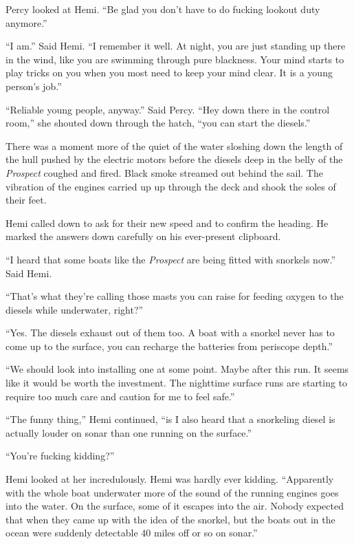 \documentclass[
]{scrbook}
\begin{document}
Percy looked at Hemi. ``Be glad you don't have to do fucking lookout
duty anymore.''

``I am.'' Said Hemi. ``I remember it well. At night, you are just
standing up there in the wind, like you are swimming through pure
blackness. Your mind starts to play tricks on you when you most need to
keep your mind clear. It is a young person's job.''

``Reliable young people, anyway.'' Said Percy. ``Hey down there in the
control room,'' she shouted down through the hatch, ``you can start the
diesels.''

There was a moment more of the quiet of the water sloshing down the
length of the hull pushed by the electric motors before the diesels deep
in the belly of the \emph{Prospect} coughed and fired. Black smoke
streamed out behind the sail. The vibration of the engines carried up up
through the deck and shook the soles of their feet.

Hemi called down to ask for their new speed and to confirm the heading.
He marked the answers down carefully on his ever-present clipboard.

``I heard that some boats like the \emph{Prospect} are being fitted with
snorkels now.'' Said Hemi.

``That's what they're calling those masts you can raise for feeding
oxygen to the diesels while underwater, right?''

``Yes. The diesels exhaust out of them too. A boat with a snorkel never
has to come up to the surface, you can recharge the batteries from
periscope depth.''

``We should look into installing one at some point. Maybe after this
run. It seems like it would be worth the investment. The nighttime
surface runs are starting to require too much care and caution for me to
feel safe.''

``The funny thing,'' Hemi continued, ``is I also heard that a snorkeling
diesel is actually louder on sonar than one running on the surface.''

``You're fucking kidding?''

Hemi looked at her incredulously. Hemi was hardly ever kidding.
``Apparently with the whole boat underwater more of the sound of the
running engines goes into the water. On the surface, some of it escapes
into the air. Nobody expected that when they came up with the idea of
the snorkel, but the boats out in the ocean were suddenly detectable 40
miles off or so on sonar.''
\end{document}
